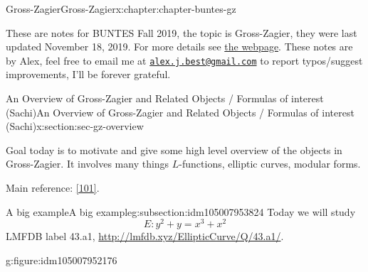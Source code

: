 \documentclass[oneside,10pt,]{book}
\numberwithin{equation}{section}
\begin{document}
\begin{chapterptx}{Gross-Zagier}{}{Gross-Zagier}{}{}{x:chapter:chapter-buntes-gz}
\begin{introduction}{}%
These are notes for BUNTES Fall 2019, the topic is Gross-Zagier, they were last updated November 18, 2019. For more details see \href{http://math.bu.edu/people/svh/GrossZagier.html}{the webpage}. These notes are by Alex, feel free to email me at \href{mailto:alex.j.best@gmail.com}{\nolinkurl{alex.j.best@gmail.com}} to report typos\slash{}suggest improvements, I'll be forever grateful.%
\end{introduction}%
%
%
\typeout{************************************************}
\typeout{************************************************}
%
\begin{sectionptx}{An Overview of Gross-Zagier and Related Objects \slash{} Formulas of interest (Sachi)}{}{An Overview of Gross-Zagier and Related Objects \slash{} Formulas of interest (Sachi)}{}{}{x:section:sec-gz-overview}
\begin{introduction}{}%
Goal today is to motivate and give some high level overview of the objects in Gross-Zagier. It involves many things \(L\)-functions, elliptic curves, modular forms.%
\par
Main reference: \hyperlink{x:biblio:bib-zagier-modular}{[101]}.%
\end{introduction}%
%
%
\typeout{************************************************}
\typeout{************************************************}
%
\begin{subsectionptx}{A big example}{}{A big example}{}{}{g:subsection:idm105007953824}
Today we will study%
\begin{equation*}
E\colon y^2 + y=  x^3 + x^2
\end{equation*}
LMFDB label 43.a1, \url{http://lmfdb.xyz/EllipticCurve/Q/43.a1/}.%
\begin{figureptx}{}{g:figure:idm105007952176}{}%
\begin{image}{0}{1}{0}%
\end{image}
\end{figureptx}
\end{subsectionptx}
\end{sectionptx}
\end{chapterptx}
\end{document}
